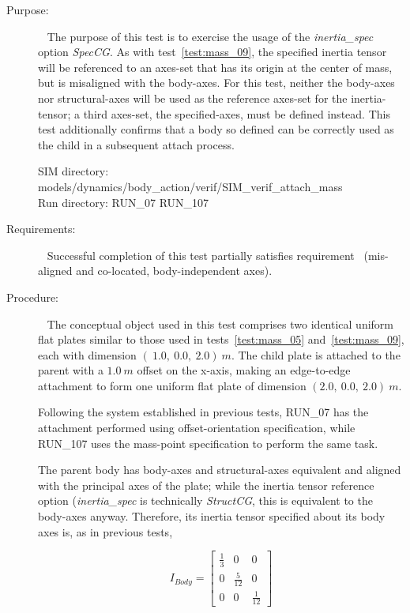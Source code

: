 \label{test:mass_07}
\begin{description}
\item[Purpose:] \ \newline
The purpose of this test is to exercise the usage of the 
\textit{inertia\_spec} option \textit{SpecCG}.  As with 
test~\ref{test:mass_09}, the specified inertia tensor will be referenced to an 
axes-set that 
has its origin at the center of mass, but is misaligned with the body-axes. 
For this test, neither the body-axes nor structural-axes will be used as the 
reference axes-set for the inertia-tensor; a third axes-set, the 
specified-axes, must be defined instead.
This test 
additionally confirms that a body so defined can be correctly used as the 
child in a subsequent attach process.

SIM directory: models/dynamics/body\_action/verif/SIM\_verif\_attach\_mass\\
Run directory: RUN\_07 RUN\_107


\item[Requirements:] \ \newline
Successful completion of this test partially satisfies
requirement~ (mis-aligned and co-located, 
body-independent axes).


\item[Procedure:]\ \newline
The conceptual object used in this test comprises two identical uniform flat 
plates similar to those used in tests~\ref{test:mass_05} 
and~\ref{test:mass_09}, each with dimension $(~1.0, ~0.0, ~2.0) ~m$.  The 
child plate is attached to the parent with a $1.0~m$ offset on the x-axis, 
making an edge-to-edge attachment to form one 
uniform flat plate of dimension $(2.0, ~0.0, ~2.0) ~m$.

Following the system established in previous tests, RUN\_07 has the attachment 
performed using offset-orientation specification, while RUN\_107 uses the 
mass-point specification to perform the same task.

The parent body has body-axes and structural-axes equivalent and aligned 
with the principal axes of the plate; while the inertia tensor reference 
option (\textit{inertia\_spec} is technically \textit{StructCG}, this is 
equivalent to the body-axes anyway.  Therefore, its inertia tensor 
specified about its body axes is, as in previous tests,

\begin{equation*}
I_{Body} = 
   \begin{bmatrix} \frac{1}{3} & 0   & 0  \\
                   0   & \frac{5}{12} & 0  \\
                    0  & 0  & \frac{1}{12} 
   \end{bmatrix}
\end{equation*} 


\end{description}
